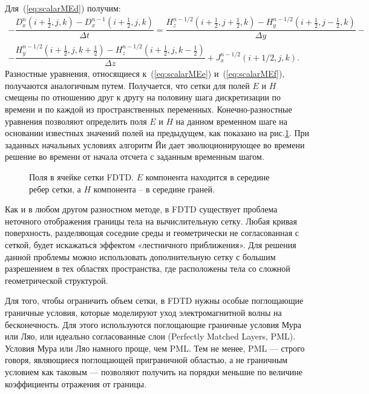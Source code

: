 Для~(\ref{eq:scalarMEd}) получим:
\begin{multline}
- \dfrac{D_{x} ^{n}(i + \frac{1}{2}, j, k) - D_{x} ^{n-1}(i + \frac{1}{2}, j, k) }{\Delta t} = \dfrac{H_{z} ^{n - 1/2} (i + \frac{1}{2}, j + \frac{1}{2}, k) - H_{y} ^{n - 1/2} (i + \frac{1}{2}, j - \frac{1}{2}, k)}{\Delta y} - \\
- \dfrac{H_{y} ^{n - 1/2} (i + \frac{1}{2}, j, k + \frac{1}{2}) - H_{z} ^{n - 1/2} (i + \frac{1}{2}, j, k - \frac{1}{2})}{\Delta z} + J_{x} ^{n - 1/2} (i + 1/2, j, k).
\label{eq:gridScalarD}
\end{multline}
Разностные уравнения, относящиеся к~(\ref{eq:scalarMEe}) и~(\ref{eq:scalarMEf}), получаются аналогичным путем. Получается, что сетки для полей $ E $ и $ H $ смещены по отношению друг к другу на половину шага дискретизации по времени и по каждой из пространственных переменных. Конечно-разностные уравнения позволяют определить поля $ E $ и $ H $ на данном временном шаге на основании известных значений полей на предыдущем, как показано на рис.\ref{img:FDTDGrid}. При заданных начальных условиях алгоритм Йи дает эволюционирующее  во времени решение во времени от начала отсчета с заданным временным шагом.

\begin{figure}[h]
\caption{Поля в ячейке сетки FDTD. $ E $ компонента находится в середине ребер сетки, а $ H $ компонента -- в середине граней\cite{FDTDYee}.}
\label{img:FDTDGrid}
\end{figure}

Как и в любом другом разностном методе, в FDTD существует проблема неточного отображения границы тела на вычислительную сетку. Любая кривая поверхность, разделяющая соседние среды и геометрически не согласованная с сеткой, будет искажаться эффектом «лестничного приближения». Для решения данной проблемы можно использовать дополнительную сетку с большим разрешением в тех областях пространства, где расположены тела со сложной геометрической структурой.

Для того, чтобы ограничить объем сетки, в FDTD нужны особые поглощающие граничные условия, которые моделируют уход электромагнитной волны на бесконечность. Для этого используются поглощающие граничные условия Мура или Ляо, или идеально согласованные слои (Perfectly Matched Layers, PML). Условия Мура или Ляо намного проще, чем PML. Тем не менее, PML — строго говоря, являющиеся поглощающей приграничной областью, а не граничным условием как таковым — позволяют получить на порядки меньшие по величине коэффициенты отражения от границы.